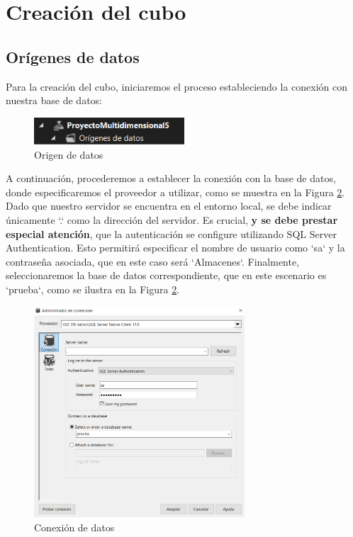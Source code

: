 \documentclass[12pt, a4paper, twoside]{article}
\begin{document}
		
	
\section{Creación del cubo}

\subsection{Orígenes de datos}

Para la creación del cubo, iniciaremos el proceso estableciendo la conexión con nuestra base de datos:

\begin{figure}[H]
	\centering
	\includegraphics[width=0.5\textwidth]{image/origenDatos}
	\caption{Origen de datos}
	\label{fig:1}
\end{figure}

A continuación, procederemos a establecer la conexión con la base de datos, donde especificaremos el proveedor a utilizar, como se muestra en la Figura \ref{fig:2}. Dado que nuestro servidor se encuentra en el entorno local, se debe indicar únicamente `.` como la dirección del servidor. Es crucial, \textbf{y se debe prestar especial atención}, que la autenticación se configure utilizando SQL Server Authentication. Esto permitirá especificar el nombre de usuario como `sa` y la contraseña asociada, que en este caso será `Almacenes`. Finalmente, seleccionaremos la base de datos correspondiente, que en este escenario es `prueba`, como se ilustra en la Figura \ref{fig:2}.

\begin{figure}[H]
	\centering
	\includegraphics[width=0.7\textwidth]{image/conexion}
	\caption{Conexión de datos}
	\label{fig:2}
\end{figure}
\end{document}
